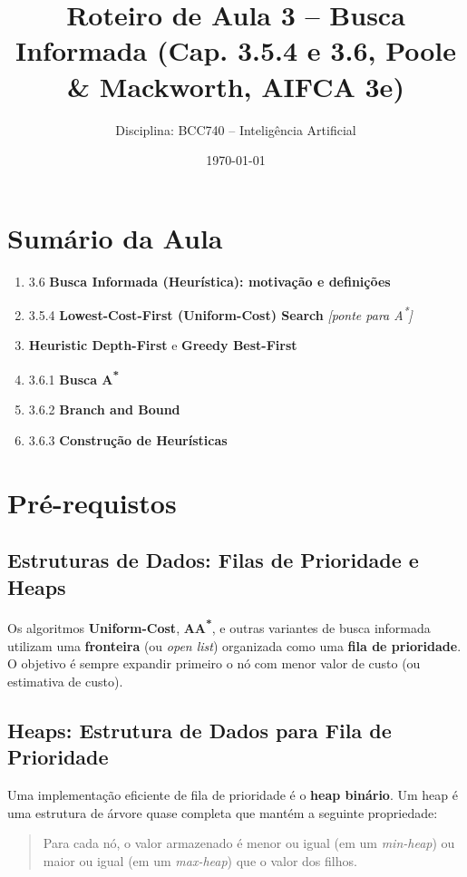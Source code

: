 \documentclass[9pt,a4paper]{extarticle}
\title{Roteiro de Aula 3 -- Busca Informada (Cap. 3.5.4 e 3.6, Poole \& Mackworth, AIFCA 3e)}
\author{Disciplina: BCC740 -- Inteligência Artificial}
\date{\today}
\newcommand{\Astar}{A\textsuperscript{*}}
\begin{document}
\maketitle

\section*{Sumário da Aula}
\begin{enumerate}
  \item 3.6 \textbf{Busca Informada (Heurística): motivação e definições}
  \item 3.5.4 \textbf{Lowest-Cost-First (Uniform-Cost) Search} \emph{[ponte para \Astar]}
  \item \textbf{Heuristic Depth-First} e \textbf{Greedy Best-First}
  \item 3.6.1 \textbf{Busca \Astar}
  \item 3.6.2 \textbf{Branch and Bound}
  \item 3.6.3 \textbf{Construção de Heurísticas}
\end{enumerate}

\section{Pré-requistos}

\subsection{Estruturas de Dados: Filas de Prioridade e Heaps}

Os algoritmos \textbf{Uniform-Cost}, \textbf{A\Astar}, e outras variantes de busca informada
utilizam uma \textbf{fronteira} (ou \textit{open list}) organizada como uma
\textbf{fila de prioridade}.  
O objetivo é sempre expandir primeiro o nó com menor valor de custo
(ou estimativa de custo).

\subsection*{Heaps: Estrutura de Dados para Fila de Prioridade}

Uma implementação eficiente de fila de prioridade é o \textbf{heap binário}.
Um heap é uma estrutura de árvore quase completa que mantém a seguinte propriedade:

\begin{quote}
  Para cada nó, o valor armazenado é menor ou igual (em um \textit{min-heap})
  ou maior ou igual (em um \textit{max-heap}) que o valor dos filhos.
\end{quote}
\end{document}
